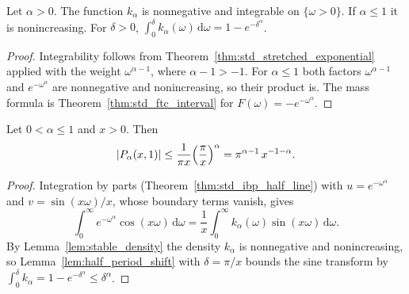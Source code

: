 \begin{lemma}\label{lem:stable_density}
\leanok
Let $\alpha > 0$. The function $k_\alpha$ is nonnegative and integrable on $\{\omega > 0\}$. If $\alpha \le 1$ it is nonincreasing. For $\delta > 0$, $\int_0^\delta k_\alpha(\omega)\, \mathrm{d}\omega = 1 - e^{-\delta^\alpha}$.
\end{lemma}

\begin{proof}
\leanok
Integrability follows from Theorem~\ref{thm:std_stretched_exponential} applied with the weight $\omega^{\alpha - 1}$, where $\alpha - 1 > -1$. For $\alpha \le 1$ both factors $\omega^{\alpha - 1}$ and $e^{-\omega^\alpha}$ are nonnegative and nonincreasing, so their product is. The mass formula is Theorem~\ref{thm:std_ftc_interval} for $F(\omega) = -e^{-\omega^\alpha}$.
\end{proof}

\begin{theorem}\label{thm:stable_tail_le_one}
\leanok
Let $0 < \alpha \le 1$ and $x > 0$. Then
\[
  \lvert P_\alpha(x, 1) \rvert \le \frac{1}{\pi x} \Bigl(\frac{\pi}{x}\Bigr)^{\alpha} = \pi^{\alpha - 1}\, x^{-1-\alpha}.
\]
\end{theorem}

\begin{proof}
\leanok
Integration by parts (Theorem~\ref{thm:std_ibp_half_line}) with $u = e^{-\omega^\alpha}$ and $v = \sin(x\omega)/x$, whose boundary terms vanish, gives
\[
  \int_0^\infty e^{-\omega^\alpha} \cos(x\omega)\, \mathrm{d}\omega = \frac{1}{x} \int_0^\infty k_\alpha(\omega) \sin(x\omega)\, \mathrm{d}\omega.
\]
By Lemma~\ref{lem:stable_density} the density $k_\alpha$ is nonnegative and nonincreasing, so Lemma~\ref{lem:half_period_shift} with $\delta = \pi / x$ bounds the sine transform by $\int_0^\delta k_\alpha = 1 - e^{-\delta^\alpha} \le \delta^\alpha$.
\end{proof}
